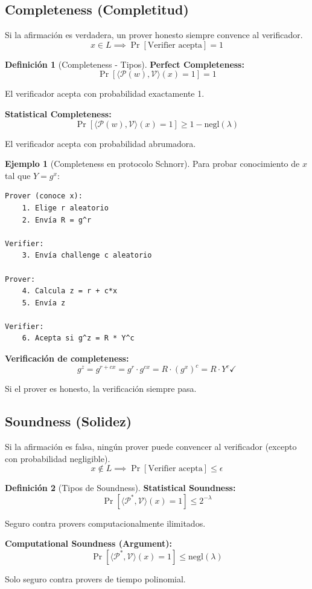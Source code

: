 \documentclass[11pt,a4paper,twoside,openright]{book}
\theoremstyle{definition}
\newtheorem{definition}{Definición}[chapter]
\newtheorem{example}{Ejemplo}[chapter]
\theoremstyle{plain}
\theoremstyle{remark}
\begin{document}
\subsection{Completeness (Completitud)}

Si la afirmación es verdadera, un prover honesto siempre convence al verificador.
\[
x \in L \implies \Pr[\text{Verifier acepta}] = 1
\]

\begin{definition}[Completeness - Tipos]
\textbf{Perfect Completeness:}
\[ \Pr[\langle \mathcal{P}(w), \mathcal{V} \rangle(x) = 1] = 1 \]

El verificador acepta con probabilidad exactamente 1.

\textbf{Statistical Completeness:}
\[ \Pr[\langle \mathcal{P}(w), \mathcal{V} \rangle(x) = 1] \geq 1 - \text{negl}(\lambda) \]

El verificador acepta con probabilidad abrumadora.
\end{definition}

\begin{example}[Completeness en protocolo Schnorr]
Para probar conocimiento de $x$ tal que $Y = g^x$:

\begin{verbatim}
Prover (conoce x):
    1. Elige r aleatorio
    2. Envía R = g^r
    
Verifier:
    3. Envía challenge c aleatorio
    
Prover:
    4. Calcula z = r + c*x
    5. Envía z
    
Verifier:
    6. Acepta si g^z = R * Y^c
\end{verbatim}

\textbf{Verificación de completeness:}
\[ g^z = g^{r + cx} = g^r \cdot g^{cx} = R \cdot (g^x)^c = R \cdot Y^c \checkmark \]

Si el prover es honesto, la verificación siempre pasa.
\end{example}

\subsection{Soundness (Solidez)}

Si la afirmación es falsa, ningún prover puede convencer al verificador (excepto con probabilidad negligible).
\[
x \notin L \implies \Pr[\text{Verifier acepta}] \leq \epsilon
\]

\begin{definition}[Tipos de Soundness]
\textbf{Statistical Soundness:}
\[ \Pr[\langle \mathcal{P}^*, \mathcal{V} \rangle(x) = 1] \leq 2^{-\lambda} \]

Seguro contra provers computacionalmente ilimitados.

\textbf{Computational Soundness (Argument):}
\[ \Pr[\langle \mathcal{P}^*, \mathcal{V} \rangle(x) = 1] \leq \text{negl}(\lambda) \]

Solo seguro contra provers de tiempo polinomial.
\end{definition}
\end{document}

